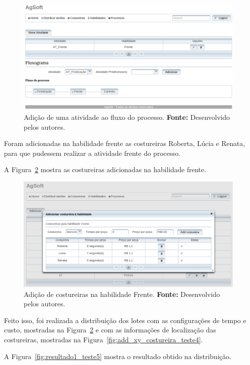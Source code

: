 \begin{figure}[h!]
	\centerline{\includegraphics[width=14.7cm]{./imagens/adicionar_atividade_frente_teste4.png}}
	\caption[Adição de uma atividade ao fluxo do processo.]
	{Adição de uma atividade ao fluxo do processo. \textbf{Fonte:} Desenvolvido
	pelos autores.}
	\label{fig:add_frente_teste4}
\end{figure}


\par Foram adicionadas na habilidade frente as costureiras Roberta, Lúcia e
Renata, para que pudessem realizar a atividade frente do processo.
\par A Figura~\ref{fig:add_costureira_frente_teste4} mostra as costureiras
adicionadas na habilidade frente.

\begin{figure}[h!]
	\centerline{\includegraphics[width=14cm]{./imagens/costureiras_at_frente_tete5.png}}
	\caption[Adição de costureiras na habilidade Frente.]
	{Adição de costureiras na habilidade Frente. \textbf{Fonte:} Desenvolvido pelos
	autores.}
	\label{fig:add_costureira_frente_teste4}
\end{figure}

\par Feito isso, foi realizada a distribuição dos lotes com as configurações de
tempo e custo, mostradas na Figura~\ref{fig:add_costureira_frente_teste4} e com
as informações de localização das costureiras, mostradas na
Figura~\ref{fig:add_xy_costureira_teste4}.
\par A Figura~\ref{fig:resultado1_teste5} mostra o resultado obtido na
distribuição.

